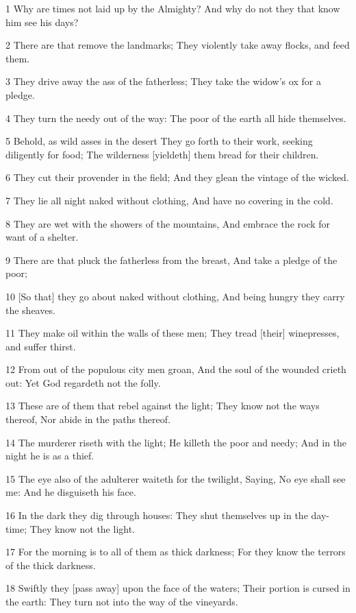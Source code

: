 \par 1 Why are times not laid up by the Almighty? And why do not they that know him see his days?
\par 2 There are that remove the landmarks; They violently take away flocks, and feed them.
\par 3 They drive away the ass of the fatherless; They take the widow's ox for a pledge.
\par 4 They turn the needy out of the way: The poor of the earth all hide themselves.
\par 5 Behold, as wild asses in the desert They go forth to their work, seeking diligently for food; The wilderness [yieldeth] them bread for their children.
\par 6 They cut their provender in the field; And they glean the vintage of the wicked.
\par 7 They lie all night naked without clothing, And have no covering in the cold.
\par 8 They are wet with the showers of the mountains, And embrace the rock for want of a shelter.
\par 9 There are that pluck the fatherless from the breast, And take a pledge of the poor;
\par 10 [So that] they go about naked without clothing, And being hungry they carry the sheaves.
\par 11 They make oil within the walls of these men; They tread [their] winepresses, and suffer thirst.
\par 12 From out of the populous city men groan, And the soul of the wounded crieth out: Yet God regardeth not the folly.
\par 13 These are of them that rebel against the light; They know not the ways thereof, Nor abide in the paths thereof.
\par 14 The murderer riseth with the light; He killeth the poor and needy; And in the night he is as a thief.
\par 15 The eye also of the adulterer waiteth for the twilight, Saying, No eye shall see me: And he disguiseth his face.
\par 16 In the dark they dig through houses: They shut themselves up in the day-time; They know not the light.
\par 17 For the morning is to all of them as thick darkness; For they know the terrors of the thick darkness.
\par 18 Swiftly they [pass away] upon the face of the waters; Their portion is cursed in the earth: They turn not into the way of the vineyards.
